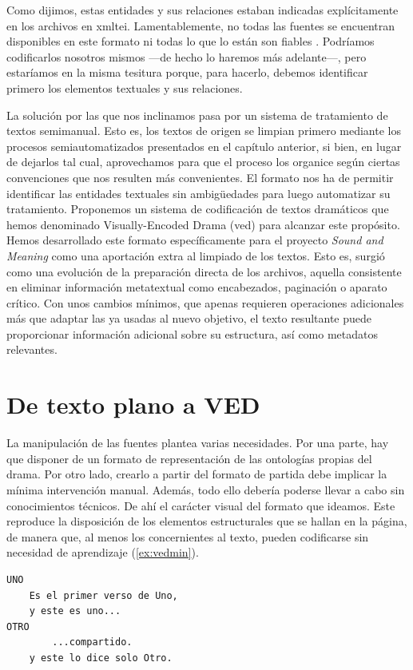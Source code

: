 Como dijimos, estas entidades y sus relaciones estaban indicadas explícitamente en los archivos en \ac{xmltei}. Lamentablemente, no todas las fuentes se encuentran disponibles en este formato ni todas lo que lo están son fiables \parencite{valdes2014b}. Podríamos codificarlos nosotros mismos —de hecho lo haremos más adelante—, pero estaríamos en la misma tesitura porque, para hacerlo, debemos identificar primero los elementos textuales y sus relaciones.

La solución por las que nos inclinamos pasa por un sistema de tratamiento de textos semimanual. Esto es, los textos de origen se limpian primero mediante los procesos  semiautomatizados presentados en el capítulo anterior, si bien, en lugar de dejarlos tal cual, aprovechamos para que el proceso los organice según ciertas convenciones que nos resulten más convenientes. El formato nos ha de permitir identificar las entidades textuales sin ambigüedades para luego automatizar su tratamiento. Proponemos un sistema de codificación de textos dramáticos que hemos denominado Visually-Encoded Drama (\ac{ved}) para alcanzar este propósito. Hemos desarrollado este formato específicamente para el proyecto \textit{Sound and Meaning} como una aportación extra al limpiado de los textos. Esto es, surgió como una evolución de la preparación directa de los archivos, aquella consistente en eliminar información metatextual como encabezados, paginación o aparato crítico. Con unos cambios mínimos, que apenas requieren operaciones adicionales más que adaptar las ya usadas al nuevo objetivo, el texto resultante puede proporcionar información adicional sobre su estructura, así como metadatos relevantes. 

\section{De texto plano a VED}
La manipulación de las fuentes plantea varias necesidades. Por una parte, hay que disponer de un formato de representación de las ontologías propias del drama. Por otro lado, crearlo a partir del formato de partida debe implicar la mínima intervención manual. Además, todo ello debería poderse llevar a cabo sin conocimientos técnicos. De ahí el carácter visual del formato que ideamos. Este reproduce la disposición de los elementos estructurales que se hallan en la página, de manera que, al menos los concernientes al texto, pueden codificarse sin necesidad de aprendizaje (\ref{ex:vedmin}).

\begin{lstlisting}[frame=none,numbers=none,caption={Ejemplo mínimo de codificación VED.},label={ex:vedmin}]
UNO
	Es el primer verso de Uno,
	y este es uno...
OTRO
		...compartido.
	y este lo dice solo Otro.
\end{lstlisting}

